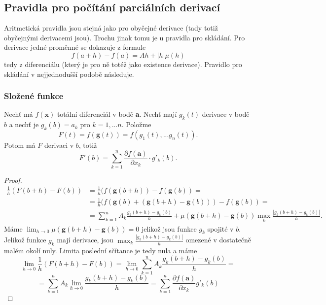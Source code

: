 \documentclass[../main.tex]{subfiles}
\begin{document}
\subsection{Pravidla pro počítání parciálních derivací}
Aritmetická pravidla jsou stejná jako pro obyčejné derivace (tady totiž obyčejnými derivacemi jsou).
Trochu jinak tomu je u pravidla pro skládání. Pro derivace jedné proměnné se dokazuje z formule
\[ f(a+h) - f(a) = Ah + |h|\mu (h) \]
tedy z diferenciálu (který je pro ně totéž jako existence derivace).
Pravidlo pro skládání v nejjednodušší podobě následuje.

\subsubsection{Složené funkce}
\begin{theorem}\label{th:dsf}
	Nechť má $f(\textbf{x})$ totální diferenciál v bodě \textbf{a}. Nechť mají $g_k(t)$ derivace v bodě $b$ a nechť je $g_k(b) = a_k$ pro 
	$k = 1,...n.$ Položme
	\[F(t) = f(\textbf{g}(t)) = f(g_1(t),...g_n(t)).\]
	Potom má $F$ derivaci v $b$, totiž 
	\[F'(b) = \sum^n_{k=1}\frac{\partial f(\textbf{a})}{\partial x_k} \cdot g'_k(b).\]
\end{theorem}

\begin{proof}
	\begin{align*} 
	 \frac{1}{h} (F(b+h) - F(b)) &= \frac{1}{h}(f(\textbf{g}(b+h)) - f(\textbf{g}(b)) =  \\
	 &=\frac{1}{h}(f(\textbf{g}(b) + (\textbf{g}(b+h) - \textbf{g}(b))) - f(\textbf{g}(b)) = \\
	 &=\sum^n_{k=1}A_k\frac{g_k(b+h)-g_k(b)}{h} + \mu(\textbf{g}(b+h) - \textbf{g}(b)) \max_k\frac{|g_k(b+h)-g_k(b)|}{h}.
	\end{align*}
	Máme $\lim_{h \rightarrow 0} \mu(\textbf{g}(b+h)-\textbf{g}(b)) = 0$ jelikož jsou funkce $g_k$ spojité v $b$. 
	Jelikož funkce $g_k$ mají derivace, jsou $\max_k \frac{|g_k(b+h) - g_k(b)|}{h}$ omezené v dostatečně malém okolí nuly. Limita 
	poslední sčítance je tedy nula a máme
	\[\lim_{h \rightarrow 0} \frac{1}{h}(F(b+h) - F(b)) = \lim_{h \rightarrow 0} \sum^n_{k = 1} A_k\frac{g_k(b+h)-g_k(b)}{h} = \]
	\[= \sum^n_{k = 1}A_k\lim_{h \rightarrow 0} \frac{g_k(b+h) - g_k(b)}{h} = \sum^n_{k = 1}\frac{\partial f(\textbf{a})}{\partial x_k}g'_k(b)\]
\end{proof}
\end{document}
